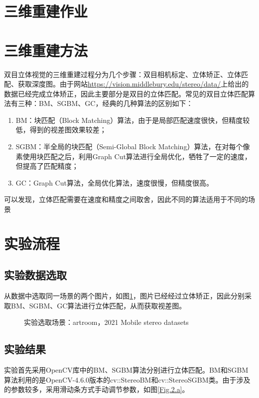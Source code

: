 \documentclass[10.5pt, a4paper]{article}
\begin{document}
{\centering\section*{\LARGE{三维重建作业}}} %
\section{三维重建方法}
双目立体视觉的三维重建过程分为几个步骤：双目相机标定、立体矫正、立体匹配、获取深度图。由于网站\url{https://vision.middlebury.edu/stereo/data/}上给出的数据已经完成立体矫正，因此主要部分是双目的立体匹配。常见的双目立体匹配算法有三种：BM、SGBM\cite{sgbm}、GC\cite{gc}，经典的几种算法的区别如下：
\begin{enumerate}[(1)]
\item BM：块匹配（Block Matching）算法，由于是局部匹配速度很快，但精度较低，得到的视差图效果较差；
\item SGBM：半全局的块匹配（Semi-Global Block Matching）算法，在对每个像素使用块匹配之后，利用Graph Cut算法进行全局优化，牺牲了一定的速度，但提高了匹配精度；
\item GC：Graph Cut算法，全局优化算法，速度很慢，但精度很高。
\end{enumerate}

可以发现，立体匹配需要在速度和精度之间取舍，因此不同的算法适用于不同的场景

\section{实验流程}
\subsection{实验数据选取}
从数据中选取同一场景的两个图片，如图\ref{Fig.1}，图片已经经过立体矫正，因此分别采取BM、SGBM、GC算法进行立体匹配，从而获取视差图。
\begin{figure}[H]
\centering  %
\caption{实验选取场景：artroom，2021 Mobile stereo datasets}
\label{Fig.1}
\end{figure}

\subsection{实验结果}
实验首先采用OpenCV库中的BM、SGBM算法分别进行立体匹配。BM和SGBM算法利用的是OpenCV-4.6.0版本的cv::StereoBM和cv::StereoSGBM类。由于涉及的参数较多，采用滑动条方式手动调节参数，如图\ref{Fig.2.a}。
\end{document}
